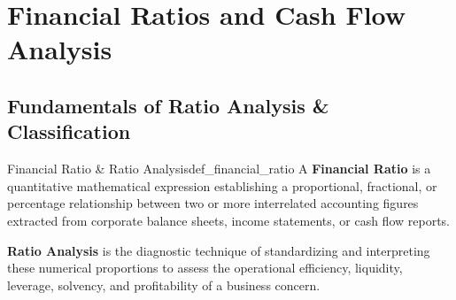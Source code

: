 \chapter{Financial Ratios and Cash Flow Analysis}

\section{Fundamentals of Ratio Analysis \& Classification}

\begin{definition}{Financial Ratio \& Ratio Analysis}{def_financial_ratio}
A \textbf{Financial Ratio} is a quantitative mathematical expression establishing a proportional, fractional, or percentage relationship between two or more interrelated accounting figures extracted from corporate balance sheets, income statements, or cash flow reports.

\textbf{Ratio Analysis} is the diagnostic technique of standardizing and interpreting these numerical proportions to assess the operational efficiency, liquidity, leverage, solvency, and profitability of a business concern.
\end{definition}

